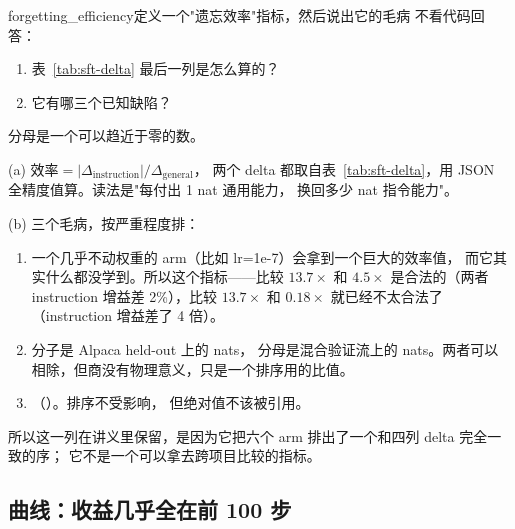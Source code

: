 \begin{checkpoint}{forgetting_efficiency}{定义一个"遗忘效率"指标，然后说出它的毛病}
不看代码回答：
\begin{enumerate}[label=(\alph*)]
  \item 表~\ref{tab:sft-delta} 最后一列是怎么算的？
  \item 它有哪三个已知缺陷？
\end{enumerate}
\hint 分母是一个可以趋近于零的数。

\ifshowanswers
\tcblower
\answer (a) $\text{效率} = |\Delta_{\text{instruction}}| / \Delta_{\text{general}}$，
两个 delta 都取自表~\ref{tab:sft-delta}，用 JSON 全精度值算。读法是"每付出 1 nat 通用能力，
换回多少 nat 指令能力"。

(b) 三个毛病，按严重程度排：
\begin{enumerate}[label=(\arabic*), topsep=2pt]
  \item {} 一个几乎不动权重的 arm（比如 lr=1e-7）会拿到一个巨大的效率值，
        而它其实什么都没学到。所以这个指标——比较
        $13.7\times$ 和 $4.5\times$ 是合法的（两者 instruction 增益差 2\%），比较 $13.7\times$ 和
        $0.18\times$ 就已经不太合法了（instruction 增益差了 4 倍）。
  \item {} 分子是 Alpaca held-out 上的 nats，
        分母是混合验证流上的 nats。两者可以相除，但商没有物理意义，只是一个排序用的比值。
  \item {}（）。排序不受影响，
        但绝对值不该被引用。
\end{enumerate}
所以这一列在讲义里保留，是因为它把六个 arm 排出了一个和四列 delta 完全一致的序；
它不是一个可以拿去跨项目比较的指标。
\fi
\end{checkpoint}

\subsection{曲线：收益几乎全在前 100 步}
\label{sec:b-sft-curve}

